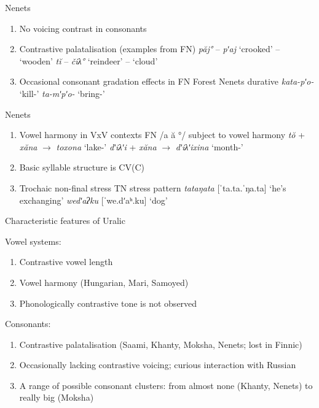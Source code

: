 \documentclass[10 pt, handout]{beamer}
\begin{document}
\begin{frame}{Nenets}
	
	\begin{enumerate}[$\gg$]
		\item No voicing contrast in consonants
		\item Contrastive palatalisation (examples from FN)
			\pex 
				\a \emph{păj°} -- \emph{pʹaj} \hfill `crooked' -- `wooden'
				\a \emph{tĭ} -- \emph{čiλ°} \hfill `reindeer' -- `cloud'
			\xe
		\item Occasional consonant gradation effects in FN
			\pex Forest Nenets durative \parencite[p. 359]{salminen2007}
				\a \emph{kata-pʹo-} \hfill `kill-{\Dur}'
				\a \emph{ta-mʹpʹo-} \hfill `bring-{\Dur}'
			\xe
	\end{enumerate}

\end{frame}

\begin{frame}{Nenets}

	\begin{enumerate}[$\gg$]
		\item Vowel harmony in VxV contexts
			\pex FN /a ă °/ subject to vowel harmony
				\a \emph{tŏ} + \emph{xăna} $\rightarrow$ \emph{toxona} \hfill `lake-{\Loc}'
				\a \emph{dʹiλʹi} + \emph{xăna} $\rightarrow$ \emph{dʹiλʹixina} \hfill `month-{\Loc}'
			\xe
		\item Basic syllable structure is CV(C)
		\item Trochaic non-final stress
			\pex TN stress pattern
				\a \emph{tataŋata} [ˈta.ta.ˈŋa.ta] \hfill `he’s exchanging'
				\a \emph{wedʹaʔku} [ˈwe.dʹaʰ.ku] \hfill `dog'
			\xe 
	\end{enumerate}

\end{frame}

\begin{frame}{Characteristic features of Uralic}

	Vowel systems:
	\begin{enumerate}[$\gg$]
		\item Contrastive vowel length
		\item Vowel harmony (Hungarian, Mari, Samoyed)
		\item Phonologically contrastive tone is not observed
	\end{enumerate}
	
\vfill
	
	Consonants:
	\begin{enumerate}[$\gg$]
		\item Contrastive palatalisation (Saami, Khanty, Moksha, Nenets; lost in Finnic)
		\item Occasionally lacking contrastive voicing; curious interaction with Russian
		\item A range of possible consonant clusters: from almost none (Khanty, Nenets) to really big (Moksha)
	\end{enumerate}

\end{frame}
\end{document}
